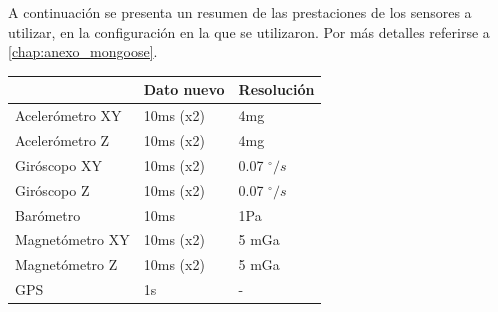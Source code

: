 \documentclass[main]{subfiles}
\begin{document}
A continuaci\'on se presenta un resumen de las prestaciones de los sensores a utilizar, en la configuraci\'on en la que se utilizaron. Por m\'as detalles referirse a \ref{chap:anexo_mongoose}.

\begin{table}[H]
\begin{center}
\begin{tabular}{|p{3.5cm}|p{2.05cm}|p{2.05cm}|}
\hline
 & Dato nuevo & Resoluci\'on \\
\hline
Aceler\'ometro XY & 10ms (x2)& 4mg\\
\hline
Aceler\'ometro Z  & 10ms (x2)& 4mg\\
\hline
Gir\'oscopo XY  & 10ms (x2)& 0.07 $^\circ/s$\\
\hline
Gir\'oscopo Z  & 10ms (x2)& 0.07 $^\circ/s$\\
\hline
Bar\'ometro  & 10ms & 1Pa\\
\hline
Magnet\'ometro XY  & 10ms  (x2)& 5 mGa\\
\hline
Magnet\'ometro Z  & 10ms (x2)& 5 mGa\\
\hline
GPS  & 1s & - \\
\hline
\end{tabular}
\label{tab:hardware:resumen-sensores}
\end{center}
\end{table}
\end{document}
